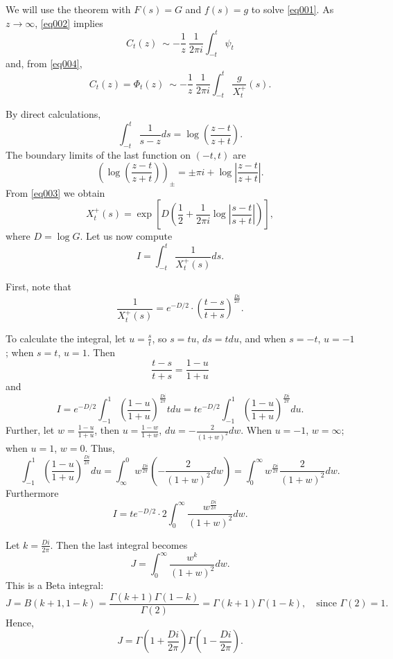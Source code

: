 \documentclass[11pt,twoside,reqno]{amsart}
\def\to{\rightarrow}
\theoremstyle{plain}
\numberwithin{equation}{section}
\begin{document}
We will use the theorem with $F(s)=G$ and $f(s)=g$ to solve \eqref{eq001}.
As $z\to\infty$, \eqref{eq002} implies
$$ C_t(z)~\sim -\frac1z ~\frac1{2\pi i}\int_{-t}^t\psi_t$$
and, from \eqref{eq004},
$$C_t(z)=\Phi_t(z)~\sim -\frac1z ~\frac1{2\pi i}\int_{-t}^t \frac{g}{X_t^+}(s).$$
 
By direct calculations,
$$\int_{-t}^t \frac{1}{s-z}ds=\log\left(\frac{z-t}{z+t}\right).$$
The boundary limits of the last function on $(-t,t)$ are
$$\left(\log\left(\frac{z-t}{z+t}\right)\right)_\pm=\pm\pi i + \log\left|\frac{z-t}{z+t}\right|.$$
From \eqref{eq003} we obtain
$$X^+_t(s)=\exp\left[D\left(\frac 12   +\frac1{2\pi i}\log\left|\frac{s-t}{s+t}\right|\right)\right],$$
where $D=\log G$.
Let us now compute
$$I=\int_{-t}^t \frac 1{X^+_t(s)}ds. $$

First, note that
\[
\frac{1}{X^+_t(s)} = e^{-D/2} \cdot \left( \frac{t-s}{t+s} \right)^{\frac{D i}{2\pi}}.
\]

To calculate the integral, let \( u = \frac{s}{t} \), so \( s = t u \), \( ds = t  du \), and when \( s = -t \), \( u = -1 \); when \( s = t \), \( u = 1 \). Then
\[
\frac{t-s}{t+s} = \frac{1 - u}{1 + u}
\]
and
\[
I = e^{-D/2} \int_{-1}^{1} \left( \frac{1 - u}{1 + u} \right)^{\frac{D i}{2\pi}} t  du = t e^{-D/2} \int_{-1}^{1} \left( \frac{1 - u}{1 + u} \right)^{\frac{D i}{2\pi}} du.
\]
Further,
let \( w = \frac{1 - u}{1 + u} \), then \( u = \frac{1 - w}{1 + w} \), \( du = -\frac{2}{(1 + w)^2} dw \).  
When \( u = -1 \), \( w = \infty \); when \( u = 1 \), \( w = 0 \).  
Thus,
\[
\int_{-1}^{1} \left( \frac{1 - u}{1 + u} \right)^{\frac{D i}{2\pi}} du = \int_{\infty}^{0} w^{\frac{D i}{2\pi}} \left( -\frac{2}{(1 + w)^2} dw \right) = \int_{0}^{\infty} w^{\frac{D i}{2\pi}} \frac{2}{(1 + w)^2} dw.
\]
Furthermore
\[
I = t e^{-D/2} \cdot 2 \int_{0}^{\infty} \frac{w^{\frac{D i}{2\pi}}}{(1 + w)^2} dw.
\]

Let \( k = \frac{D i}{2\pi} \). Then the last integral becomes
\[
J = \int_{0}^{\infty} \frac{w^{k}}{(1 + w)^2} dw.
\]
This is a Beta integral:
\[
J = B(k + 1, 1 - k) = \frac{\Gamma(k + 1) \Gamma(1 - k)}{\Gamma(2)} = \Gamma(k + 1) \Gamma(1 - k), \quad \text{since } \Gamma(2) = 1.
\]
Hence,
\[
J = \Gamma\left(1 + \frac{D i}{2\pi}\right) \Gamma\left(1 - \frac{D i}{2\pi}\right).
\]
\end{document}
